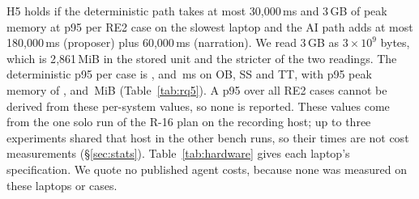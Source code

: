 H5 holds if the deterministic path takes at most 30{,}000\,ms and 3\,GB of peak memory at p95 per RE2 case on the slowest laptop and the AI path adds at most 180{,}000\,ms (proposer) plus 60{,}000\,ms (narration).
We read 3\,GB as $3 \times 10^9$ bytes, which is 2{,}861\,MiB in the stored unit and the stricter of the two readings.
The deterministic p95 per case is ,  and \,ms on OB, SS and TT, with p95 peak memory of ,  and \,MiB (Table~\ref{tab:rq5}). A p95 over all RE2 cases cannot be derived from these per-system values, so none is reported.
These values come from the one solo run of the R-16 plan on the recording host; up to three experiments shared that host in the other bench runs, so their times are not cost measurements (\S\ref{sec:stats}).
Table~\ref{tab:hardware} gives each laptop's specification.
We quote no published agent costs, because none was measured on these laptops or cases.
